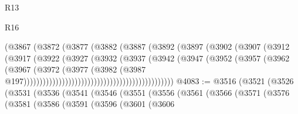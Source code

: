 \begin{lexlean}{R13}
\begin{lexlean}{R16}
\begin{coremodule}
{{{{{{{{{{{{{{{{{{{{{{{{{{{{{{{{{{{{{{{{{{{{{{{{{{{{{{{{{{{{{{{{{{{{{{{{{{{{{{{{{{{{{{{{{{{{{{{{{{{{{{{{{{{{{{{{{                                                (@3867
                                                  (@3872
                                                    (@3877
                                                      (@3882
                                                        (@3887
                                                          (@3892
                                                            (@3897
                                                              (@3902
                                                                (@3907
                                                                  (@3912
                                                                    (@3917
                                                                      (@3922
                                                                        (@3927
                                                                          (@3932
                                                                            (@3937
                                                                              (@3942
                                                                                (@3947
                                                                                  (@3952
                                                                                    (@3957
                                                                                      (@3962
                                                                                        (@3967
                                                                                          (@3972
                                                                                            (@3977
                                                                                              (@3982
                                                                                                (@3987
                                                                                                  @197)))))))))))))))))))))))))))))))))))))))))))))))
@4083 := @3516
    (@3521
      (@3526
        (@3531
          (@3536
            (@3541
              (@3546
                (@3551
                  (@3556
                    (@3561
                      (@3566
                        (@3571
                          (@3576
                            (@3581
                              (@3586
                                (@3591
                                  (@3596
                                    (@3601
                                      (@3606
}}}}}}}}}}}}}}}}}}}}}}}}}}}}}}}}}}}}}}}}}}}}}}}}}}}}}}}}}}}}}}}}}}}}}}}}}}}}}}}}}}}}}}}}}}}}}}}}}}}}}}}}}}}}}}}}}
\end{coremodule}
\end{lexlean}
\end{lexlean}
